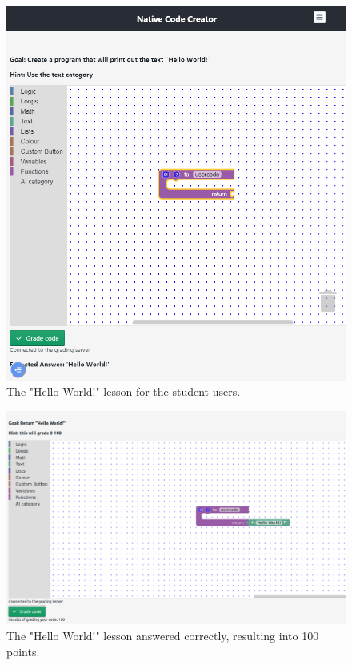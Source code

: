 \documentclass[draftclsnofoot,10pt,onecolumn]{IEEEtran}
\begin{document}
\begin{figure}[h]
    \centering
    \includegraphics[width=\textwidth]{caps9}
    \caption{The "Hello World!" lesson for the student users.}
\end{figure}

\begin{figure}[h]
    \centering
    \includegraphics[width=\textwidth]{caps10}
    \caption{The "Hello World!" lesson answered correctly, resulting into 100 points.}
\end{figure}
\end{document}
